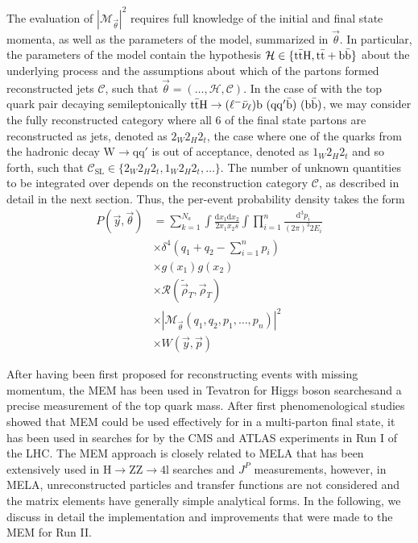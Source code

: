The evaluation of $|\mathcal{M}_{\vec{\theta}}|^2$ requires full knowledge of the initial and final state momenta, as well as the parameters of the model, summarized in $\vec{\theta}$. In particular, the parameters of the model contain the hypothesis $\mathcal{H} \in \{\mathrm{t} \bar{\mathrm{t}} \mathrm{H}, \mathrm{t} \bar{\mathrm{t}} + \mathrm{b}\bar{\mathrm{b}}\}$ about the underlying process and the assumptions about which of the partons formed reconstructed jets $\mathcal{C}$, such that $\vec{\theta} = (\dots, \mathcal{H}, \mathcal{C})$. In the case of \ttH with the top quark pair decaying semileptonically $\mathrm{t} \bar{\mathrm{t}} \mathrm{H} \rightarrow (\ell^- \bar{\mathrm{\nu}}_\ell) \mathrm{b}\ (\mathrm{q} \mathrm{q}' \bar{\mathrm{b}})\ (\mathrm{b} \bar{\mathrm{b}})$, we may consider the fully reconstructed category where all 6 of the final state partons are reconstructed as jets, denoted as $2_W 2_H 2_t$, the case where one of the quarks from the hadronic decay $\mathrm{W} \rightarrow \mathrm{q} \mathrm{q}'$ is out of acceptance, denoted as $1_W 2_H 2_t$ and so forth, such that $\mathcal{C}_{\mathrm{SL}} \in \{ 2_W 2_H 2_t, 1_W 2_H 2_t, \dots \}$. The number of unknown quantities to be integrated over depends on the reconstruction category $\mathcal{C}$, as described in detail in the next section. 
Thus, the per-event probability density takes the form
\begin{align}
\label{eq:mem_definition}
P(\vec{y}, \vec{\theta}) &= \sum_{k=1}^{N_a} \int \frac{\mathrm{d}x_1 \mathrm{d}x_2}{2 x_1 x_2 s} \int \prod_{i=1}^{n} \frac{\mathrm{d}^3 p_i}{(2\pi)^3 2 E_i} \\
&\times \delta^4 (q_1 + q_2 - \sum_{i=1}^n p_i)\\
&\times g(x_1) g(x_2) \\ 
&\times \mathcal{R}(\tilde{\vec{\rho}}_T, \vec{\rho}_T) \\ 
&\times |\mathcal{M}_{\vec{\theta}}(q_1, q_2, p_1, \dots, p_n)|^2 \\
&\times W(\vec{y}, \vec{p})
\end{align}

After having been first proposed for reconstructing events with missing momentum\cite{Kondo1988}, the MEM has been used in Tevatron for Higgs boson searches\fix and a precise measurement of the top quark mass\cite{D0topmass2004}. After first phenomenological studies showed that MEM could be used effectively for \ttH in a multi-parton final state\cite{Artoisenet2013}, it has been used in searches for \ttH by the CMS and ATLAS experiments in Run I of the LHC\fix. The MEM approach is closely related to MELA\cite{Gao} that has been extensively used in $\mathrm{H} \rightarrow \mathrm{ZZ} \rightarrow 4\mathrm{l}$ searches and $J^P$ measurements, however, in MELA, unreconstructed particles and transfer functions are not considered and the matrix elements have generally simple analytical forms.
In the following, we discuss in detail the implementation and improvements that were made to the MEM for Run II.

